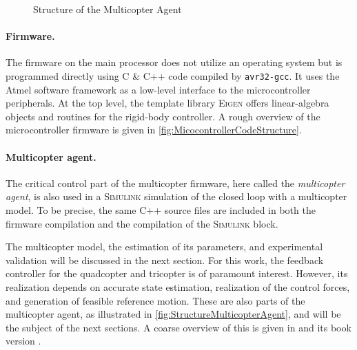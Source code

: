 \begin{figure}[p]
 \centering
 \footnotesize
 \newcommand{\macGroundstation}{\textcolor{white}{\textbf{Groundstation} (Win7 PC)}}
 \newcommand{\macMulticopterRealization}{\textcolor{white}{\textbf{Multicopter}}}
 \newcommand{\macRBSI}{\textcolor{white}{\textbf{rigid}}}
 \newcommand{\macRBSII}{\textcolor{white}{\textbf{body}}}
 \newcommand{\macRBSIII}{\textcolor{white}{\textbf{system}}}
 \newcommand{\macMCI}{\textcolor{white}{\textbf{main}}}
 \newcommand{\macMCII}{\textcolor{white}{\textbf{controller}}}
 
 \vspace{-2mm}
 \caption{Multicopter Hardware realization}
 \label{fig:MulticopterRealizationOverview}
 \vspace{5mm}
 
 \vspace{-1mm}
 \caption{Controller code structure}
 \label{fig:MicocontrollerCodeStructure}
 \vspace{5mm}
 \footnotesize
 
 \caption{Structure of the Multicopter Agent}
 \label{fig:StructureMulticopterAgent}
\end{figure}


\paragraph{Firmware.}
The firmware on the main processor does not utilize an operating system but is programmed directly using C \& C++ code compiled by \texttt{avr32-gcc}.
It uses the Atmel software framework as a low-level interface to the microcontroller peripherals.
At the top level, the template library \textsc{Eigen} offers linear-algebra objects and routines for the rigid-body controller.
A rough overview of the microcontroller firmware is given in \autoref{fig:MicocontrollerCodeStructure}.

\paragraph{Multicopter agent.}
The critical control part of the multicopter firmware, here called the \textit{multicopter agent}, is also used in a \textsc{Simulink} simulation of the closed loop with a multicopter model.
To be precise, the same C++ source files are included in both the firmware compilation and the compilation of the \textsc{Simulink} block.

The multicopter model, the estimation of its parameters, and experimental validation will be discussed in the next section.
For this work, the feedback controller for the quadcopter and tricopter is of paramount interest.
However, its realization depends on accurate state estimation, realization of the control forces, and generation of feasible reference motion.
These are also parts of the multicopter agent, as illustrated in \autoref{fig:StructureMulticopterAgent}, and will be the subject of the next sections.
A coarse overview of this is given in \cite{Konz:Mechatronics} and its book version \cite{Konz:MechatronicsBook}.
